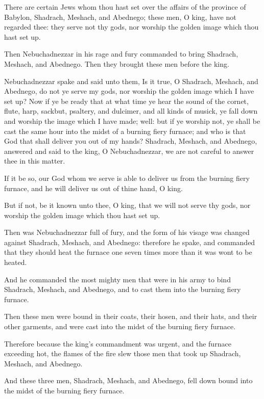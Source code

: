 \Verse There are certain Jews whom thou hast set over the affairs of the province of Babylon, Shadrach, Meshach, and Abednego; these men, O king, have not regarded thee: they serve not thy gods, nor worship the golden image which thou hast set up.

\Verse Then Nebuchadnezzar in his rage and fury commanded to bring Shadrach, Meshach, and Abednego. Then they brought these men before the king.

\Verse Nebuchadnezzar spake and said unto them, Is it true, O Shadrach, Meshach, and Abednego, do not ye serve my gods, nor worship the golden image which I have set up?  \Verse Now if ye be ready that at what time ye hear the sound of the cornet, flute, harp, sackbut, psaltery, and dulcimer, and all kinds of musick, ye fall down and worship the image which I have made; well: but if ye worship not, ye shall be cast the same hour into the midst of a burning fiery furnace; and who is that God that shall deliver you out of my hands?  \Verse Shadrach, Meshach, and Abednego, answered and said to the king, O Nebuchadnezzar, we are not careful to answer thee in this matter.

\Verse If it be so, our God whom we serve is able to deliver us from the burning fiery furnace, and he will deliver us out of thine hand, O king.

\Verse But if not, be it known unto thee, O king, that we will not serve thy gods, nor worship the golden image which thou hast set up.

\Verse Then was Nebuchadnezzar full of fury, and the form of his visage was changed against Shadrach, Meshach, and Abednego: therefore he spake, and commanded that they should heat the furnace one seven times more than it was wont to be heated.

\Verse And he commanded the most mighty men that were in his army to bind Shadrach, Meshach, and Abednego, and to cast them into the burning fiery furnace.

\Verse Then these men were bound in their coats, their hosen, and their hats, and their other garments, and were cast into the midst of the burning fiery furnace.

\Verse Therefore because the king's commandment was urgent, and the furnace exceeding hot, the flames of the fire slew those men that took up Shadrach, Meshach, and Abednego.

\Verse And these three men, Shadrach, Meshach, and Abednego, fell down bound into the midst of the burning fiery furnace.

